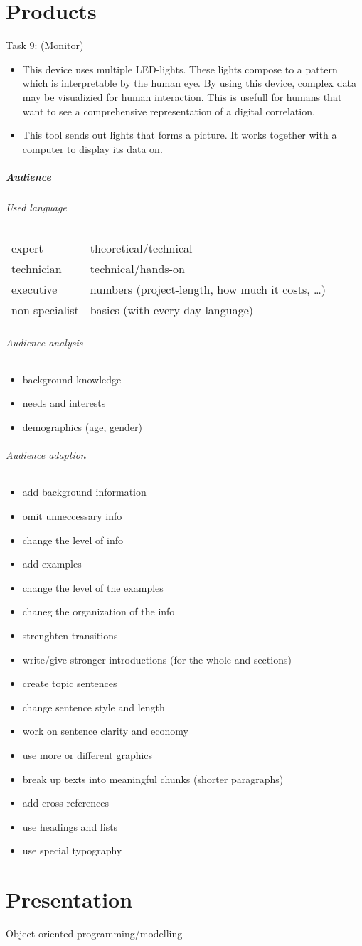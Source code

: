 \chapter{Products}

Task 9: (Monitor)
\begin{itemize}
\item This device uses multiple LED-lights. These lights compose to a pattern which is interpretable by the human eye. By using this device, complex data may be visualizied for human interaction. This is usefull for humans that want to see a comprehensive representation of a digital correlation.
\item This tool sends out lights that forms a picture. It works together with a computer to display its data on.
\end{itemize}

\paragraph{Audience}
\subparagraph{Used language} \parskp
\begin{tabular}{l l}
expert & theoretical/technical\\
technician & technical/hands-on\\
executive & numbers (project-length, how much it costs, …)\\
non-specialist & basics (with every-day-language)
\end{tabular}

\subparagraph{Audience analysis}
\begin{itemize}
\item background knowledge
\item needs and interests
\item demographics (age, gender)
\end{itemize}

\subparagraph{Audience adaption}
\begin{itemize}
\item add background information
\item omit unneccessary info
\item change the level of info
\item add examples
\item change the level of the examples
\item chaneg the organization of the info
\item strenghten transitions
\item write/give stronger introductions (for the whole and sections)
\item create topic sentences
\item change sentence style and length
\item work on sentence clarity and economy
\item use more or different graphics
\item break up texts into meaningful chunks (shorter paragraphs)
\item add cross-references
\item use headings and lists
\item use special typography
\end{itemize}


\chapter{Presentation}
Object oriented programming/modelling

